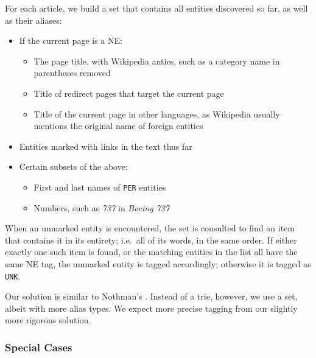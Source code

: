 \documentclass[11pt]{article}
\begin{document}
For each article, we build a set that contains all entities discovered so far, as well as their aliases:
\begin{itemize}
\item If the current page is a NE:
  \begin{itemize}
  \item The page title, with Wikipedia antics, such as a category name in parentheses removed
  \item Title of redirect pages that target the current page
  \item Title of the current page in other languages, as Wikipedia usually mentions the original name of foreign entities
  \end{itemize}
\item Entities marked with links in the text thus far
\item Certain subsets of the above:
  \begin{itemize}
  \item First and last names of \texttt{PER} entities
  \item Numbers, such as \textit{737} in \textit{Boeing 737}
  \end{itemize}
\end{itemize}

When an unmarked entity is encountered, the set is consulted to find an item that contains it in its entirety; i.e.~all of its words, in the same order. If either exactly one such item is found, or the matching entities in the list all have the same NE tag, the unmarked entity is tagged accordingly; otherwise it is tagged as \texttt{UNK}.

Our solution is similar to Nothman's . Instead of a trie, however, we use a set, albeit with more alias types. We expect more precise tagging from our slightly more rigorous solution.

\subsubsection{Special Cases}

\end{document}
